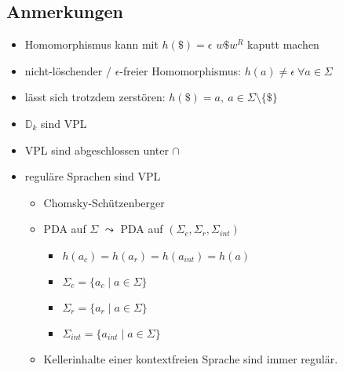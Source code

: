     \subsection{Anmerkungen}
    \begin{itemize}
        \item Homomorphismus kann mit $h(\$)=\epsilon$ $w\$ w^R$ kaputt machen
        \item nicht-löschender / $\epsilon$-freier Homomorphismus: $h(a)\not= \epsilon\ \forall a\in\Sigma$
        \item lässt sich trotzdem zerstören: $h(\$)=a,\ a\in\Sigma\setminus\{\$\}$
        \item $\mathds{D}_k$ sind VPL
        \item VPL sind abgeschlossen unter $\cap$
        \item reguläre Sprachen sind VPL
        \begin{itemize}
            \item Chomsky-Schützenberger
            \item PDA auf $\Sigma$ $\leadsto$ PDA auf $(\Sigma_c,\Sigma_r,\Sigma_{int})$
            \begin{itemize}
                \item $h(a_c)=h(a_r)=h(a_{int})=h(a)$
                \item $\Sigma_c=\{a_c\mid a\in\Sigma\}$
                \item $\Sigma_r=\{a_r\mid a\in\Sigma\}$
                \item $\Sigma_{int}=\{a_{int}\mid a\in\Sigma\}$
            \end{itemize}
            \item Kellerinhalte einer kontextfreien Sprache sind immer regulär.
        \end{itemize}
    \end{itemize}
